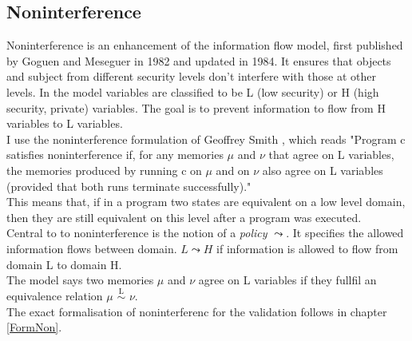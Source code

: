 \subsection{Noninterference}
Noninterference is an enhancement of the information flow model, first published by Goguen and Meseguer in 1982 and updated in 1984. It ensures that objects and subject from different security levels don't interfere with those at other levels. In the model variables are classified to be L (low security) or H (high security, private) variables. The goal is to prevent information to flow from H variables to L variables. \\
I use the noninterference formulation of Geoffrey Smith \cite{InfFlow}, which reads "Program c satisfies noninterference if, for any memories $\mu$ and $\nu$ that agree on L variables, the memories produced by running c on $\mu$ and on $\nu$ also agree on L variables (provided that both runs terminate successfully)." \\
This means that, if in a program two states are equivalent on a low level domain, then they are still equivalent on this level after a program was executed.\\
Central to to noninterference is the notion of a \textit{policy} $\leadsto$. It specifies the allowed information  flows between domain. $L \leadsto H$ if information is allowed to flow from domain L to domain H. \\
The model says two memories $\mu$ and $\nu$ agree on L variables if they fullfil an equivalence relation $\mu$ $\overset{\text{L}}{\sim}$ $\nu$. \\
The exact formalisation of noninterferenc for the validation follows in chapter \ref{FormNon}.